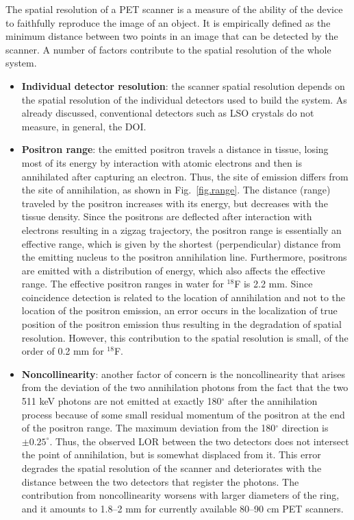 \documentclass[review]{elsarticle}
\begin{document}
The spatial resolution of a PET scanner is a measure of the ability of the device to faithfully reproduce the image of an object. It is empirically defined as the minimum distance between two points in an image that can be detected by the scanner. A number of factors contribute to the spatial resolution of the whole system.
\begin{itemize}
\item {\bf Individual detector resolution}: the scanner spatial resolution depends on the spatial resolution of the individual detectors used to build the system. As already discussed, conventional detectors such as LSO crystals do not measure, in general, the DOI.   
\item {\bf Positron range}: the emitted positron travels a distance in tissue, losing most of its energy by interaction with atomic electrons and then is annihilated after capturing an electron. Thus, the site of emission differs from the site of annihilation, as shown in Fig.~\ref{fig.range}. The distance (range) traveled by the positron increases with its energy, but decreases with the tissue density. Since the positrons are deflected after interaction with electrons resulting in a zigzag trajectory, the positron range is essentially an effective range, which is given by the shortest (perpendicular) distance from the emitting nucleus to the positron annihilation line. Furthermore, positrons are emitted with a distribution of energy, which also affects the effective range. The effective positron ranges in water for \ensuremath{^{18}}F is 2.2 mm. Since coincidence detection is related to the location of annihilation and not to the location of the positron emission, an error  occurs in the localization of true position of the positron emission thus resulting in the degradation of spatial resolution. However, this contribution to the spatial resolution is small, of the order of 0.2 mm for \ensuremath{^{18}}F.
\item {\bf Noncollinearity}: another factor of concern is the noncollinearity that arises from the deviation of the two annihilation photons from the fact that the two 511 keV photons are not emitted at exactly 180$^\circ$ after the annihilation process because of some small residual momentum of the positron at the end of the positron range. The maximum deviation from the 180$^\circ$ direction is $\pm 0.25^\circ$. Thus, the observed LOR between the two detectors does not intersect the point of annihilation, but is somewhat displaced from it. This error  degrades the spatial resolution of the scanner and deteriorates with the distance between the two detectors that register the photons. The contribution from noncollinearity worsens with larger diameters of the ring, and it amounts to 1.8--2 mm for currently available 80--90 cm PET scanners.
\end{itemize}
\end{document}
